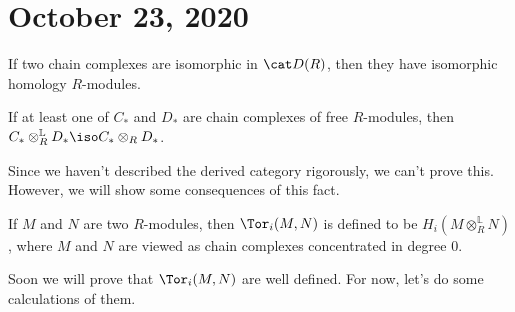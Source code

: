 \documentclass{standalone}
\begin{document}
\chapter{October 23, 2020}

If two chain complexes are isomorphic in \(\der(R)\),
then they have isomorphic homology \(R\)-modules.

\begin{fact}
  If at least one of \(C_*\) and \(D_*\) are
  chain complexes of free \(R\)-modules,
  then \(C_* \otimes_R^{\mathbb L} D_* \iso C_* \otimes_R D_*\).
\end{fact}
Since we haven't described the derived category rigorously,
we can't prove this. However, we will show some consequences of this fact.

\begin{definition}
  If \(M\) and \(N\) are two \(R\)-modules, then \(\Tor_i(M, N)\)
  is defined to be \(H_i(M \otimes^{\mathbb L}_R N)\),
  where \(M\) and \(N\) are viewed as
  chain complexes concentrated in degree \(0\).
\end{definition}
Soon we will prove that \(\Tor_i(M, N)\) are well defined.
For now, let's do some calculations of them.
\end{document}
